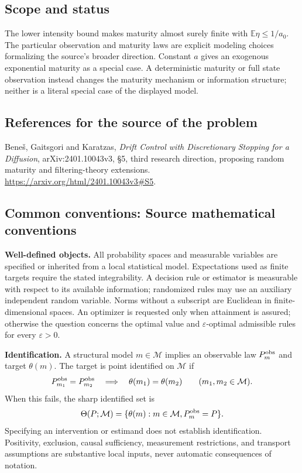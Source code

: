 \documentclass[11pt,a4paper]{article}
\newcommand{\E}{\mathbb E}
\begin{document}
\subsection*{Scope and status}
The lower intensity bound makes maturity almost surely finite with
$\E\eta\leq1/a_0$. The particular observation and maturity laws are
explicit modeling choices formalizing the source's broader direction.
Constant $a$ gives an exogenous exponential maturity as a special case.
A deterministic maturity or full state observation instead changes the
maturity mechanism or information structure; neither is a literal special
case of the displayed model.
\subsection*{References for the source of the problem}
Bene\v{s}, Gaitsgori and Karatzas, \emph{Drift Control with Discretionary
Stopping for a Diffusion}, arXiv:2401.10043v3, \S5, third research
direction, proposing random maturity and filtering-theory extensions.
\url{https://arxiv.org/html/2401.10043v3#S5}.

\subsection*{Common conventions: Source mathematical conventions}

\textbf{Well-defined objects.}
All probability spaces and measurable variables are specified or inherited
from a local statistical model. Expectations used as finite targets require
the stated integrability. A decision rule or estimator is measurable with
respect to its available information; randomized rules may use an auxiliary
independent random variable. Norms without a subscript are Euclidean in
finite-dimensional spaces. An optimizer is requested only when attainment
is assured; otherwise the question concerns the optimal value and
$\varepsilon$-optimal admissible rules for every $\varepsilon>0$.

\textbf{Identification.}
A structural model $m\in\mathcal M$ implies an observable law
$P_m^{\rm obs}$ and target $\theta(m)$. The target is point identified on
$\mathcal M$ if
\[
 P_{m_1}^{\rm obs}=P_{m_2}^{\rm obs}
 \quad\Longrightarrow\quad\theta(m_1)=\theta(m_2)
 \qquad(m_1,m_2\in\mathcal M).
\]
When this fails, the sharp identified set is
\[
 \Theta(P;\mathcal M)=\{\theta(m):m\in\mathcal M,
                                  P_m^{\rm obs}=P\}.
\]
Specifying an intervention or estimand does not establish identification.
Positivity, exclusion, causal sufficiency, measurement restrictions, and
transport assumptions are substantive local inputs, never automatic
consequences of notation.
\end{document}
